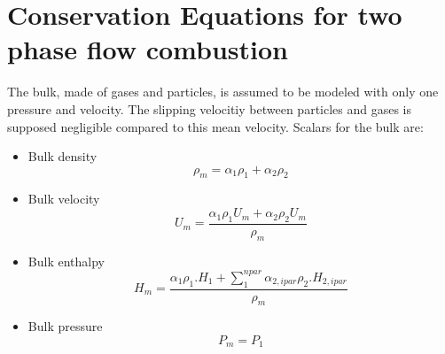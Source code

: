 
\section*[Conservation Equations]{Conservation Equations for two phase flow combustion}

The bulk, made of gases and particles, is assumed to be modeled with only one pressure and velocity. The slipping velocitiy between particles 
and gases is supposed negligible compared to this mean velocity.
Scalars for the bulk are:
\vspace{0.5cm}
\begin{itemize}
  \item Bulk density 
     \begin{equation} 
        \rho_{m} = \alpha_{1}\rho_{1} + \alpha_{2}\rho_{2}
     \end{equation} 

  \item Bulk velocity 
     \begin{equation} 
       U_{m} = \frac{ \alpha_{1}\rho_{1} U_{m} 
                    + \alpha_{2}\rho_{2} U_{m} }{\rho_{m}}
     \end{equation}

  \item Bulk enthalpy 
     \begin{equation} 
        H_{m} = \frac{ \alpha_{1}\rho_{1}.H_{1} 
                     + \sum_{1}^{npar}\alpha_{2,ipar}\rho_{2}.H_{2,ipar} }{\rho_{m}}
     \end{equation} 

  \item Bulk pressure 
     \begin{equation} 
       P_{m} = P_{1}
     \end{equation}
\end{itemize}

